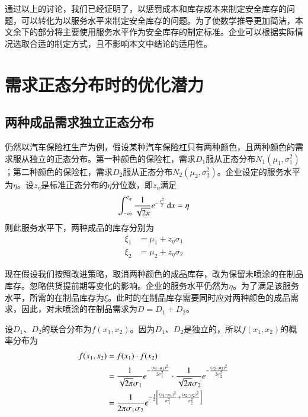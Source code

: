 通过以上的讨论，我们已经证明了，以惩罚成本和库存成本来制定安全库存的问题，可以转化为以服务水平来制定安全库存的问题。为了使数学推导更加简洁，本文余下的部分将主要使用服务水平作为安全库存的制定标准。企业可以根据实际情况选取合适的制定方式，且不影响本文中结论的适用性。












\section{需求正态分布时的优化潜力}

\subsection{两种成品需求独立正态分布}

仍然以汽车保险杠生产为例，假设某种汽车保险杠只有两种颜色，且两种颜色的需求服从独立的正态分布。第一种颜色的保险杠，需求$D_1$服从正态分布$N_1(\mu_1,\sigma_1^2)$；第二种颜色的保险杠，需求$D_2$服从正态分布$N_2(\mu_2,\sigma_2^2)$。企业设定的服务水平为$\eta$。设$z_\eta$是标准正态分布的$\eta$分位数，即$z_\eta$满足
\[
\int_{-\infty}^{z_\eta}\frac{1}{\sqrt{2\pi}}e^{-\frac{x^2}{2}}\operatorname{d\!} x = \eta
\]
则此服务水平下，两种成品的库存分别为
\begin{align}
\xi_1 &= \mu_1 + z_\eta\sigma_1 \label{eq:成品库存1}\\
\xi_2 &= \mu_2 + z_\eta\sigma_2 \label{eq:成品库存2}
\end{align}

现在假设我们按照改进策略，取消两种颜色的成品库存，改为保留未喷涂的在制品库存。忽略供货提前期等变化的影响。企业的服务水平仍然为$\eta$。为了满足该服务水平，所需的在制品库存为$\xi$。此时的在制品库存需要同时应对两种颜色的成品需求，因此，对未喷涂的在制品需求为$D=D_1+D_2$。

设$D_1$、$D_2$的联合分布为$f(x_1,x_2)$。因为$D_1$、$D_2$是独立的，所以$f(x_1,x_2)$的概率分布为
\begin{align}
f(x_1,x_2) &= f(x_1)\cdot f(x_2) \notag\\
&= \frac{1}{\sqrt{2\pi}\sigma_1}e^{-\frac{(x_1-\mu_1)^2}{2\sigma_1^2}}\cdot \frac{1}{\sqrt{2\pi}\sigma_2}e^{-\frac{(x_2-\mu_2)^2}{2\sigma_2^2}} \notag\\
&= \frac{1}{2\pi\sigma_1\sigma_2}e^{-\frac{1}{2}\left[\frac{(x_1-\mu_1)^2}{\sigma_1^2}+\frac{(x_2-\mu_2)^2}{\sigma_2^2}\right]}
\label{eq:联合分布}
\end{align}

